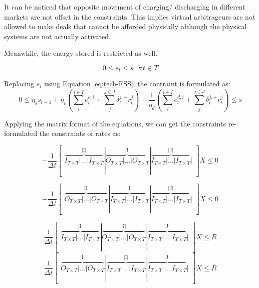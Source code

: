 It can be noticed that opposite movement of charging/ discharging in different markets are not offset in the constraints. This implies virtual arbitrageurs are not allowed to make deals that cannot be afforded physically although the physical systems are not actually activated.

Meanwhile, the energy stored is restricted as well.

\begin{equation}
0 \leq s_t \leq \overline{s}~~~ \forall t \in T
\end{equation}

Replacing $s_t$ using Equation \eqref{eq:tech-ESS}, the contraint is formulated as:
\begin{equation}
0 \leq \eta_s s_{t-1} + \eta_c (\sum_{i}^{i \in I} e_t^{c,i} + \sum_{j}^{j \in J}\delta_t^{j,-}r_t^j)- \frac{1}{\eta_d} (\sum_{i}^{i \in I} e_t^{d,i} + \sum_{j}^{j \in J}\delta_t^{j,+}r_t^j) \leq \overline{s}
\end{equation}

Applying the matrix format of the equations, we can get the constraints re-formulated the constraints of rates as:

\begin{equation}
- \frac{1}{\Delta t} \begin{bmatrix}
\overbrace{ I_{T\times T}|\dots|I_{T\times T}}^\text{|I|}|\overbrace{O_{T\times T}|\dots|O_{T\times T}}^\text{|I|}|\overbrace{ I_{T\times T}|\dots|I_{T\times T}}^\text{|J|}| 
\end{bmatrix} X \leq 0
\end{equation}

\begin{equation}
- \frac{1}{\Delta t} \begin{bmatrix}
\overbrace{ O_{T\times T}|\dots|O_{T\times T}}^\text{|I|}|\overbrace{I_{T\times T}|\dots|I_{T\times T}}^\text{|I|}|\overbrace{ I_{T\times T}|\dots|I_{T\times T}}^\text{|J|}| 
\end{bmatrix} X \leq 0
\end{equation}

\begin{equation}
\label{constraint:ESS-capacity}
\frac{1}{\Delta t} \begin{bmatrix}
\overbrace{ I_{T\times T}|\dots|I_{T\times T}}^\text{|I|}|\overbrace{O_{T\times T}|\dots|O_{T\times T}}^\text{|I|}|\overbrace{ I_{T\times T}|\dots|I_{T\times T}}^\text{|J|}| 
\end{bmatrix}X \leq \overline{R}
\end{equation}
\begin{equation}
\label{constraint:ESS-capacity-2}
\frac{1}{\Delta t} \begin{bmatrix}
\overbrace{ O_{T\times T}|\dots|O_{T\times T}}^\text{|I|}|\overbrace{I_{T\times T}|\dots|I_{T\times T}}^\text{|I|}|\overbrace{ I_{T\times T}|\dots|I_{T\times T}}^\text{|J|}| 
\end{bmatrix}X \leq \overline{R}
\end{equation}


